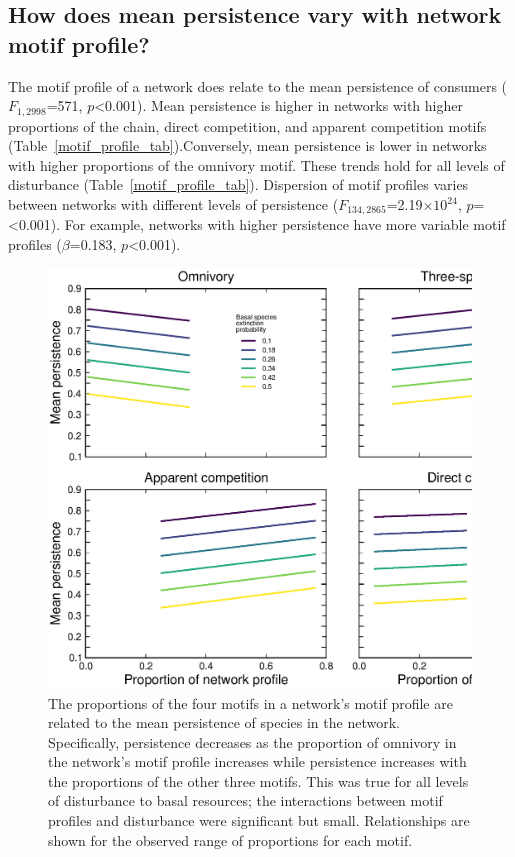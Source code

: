 \documentclass[12pt]{article}
\begin{document}
\begin{spacing}{2.0}
    \clearpage

    \subsection*{How does mean persistence vary with network motif profile?}
    
        The motif profile of a network does relate to the mean persistence of consumers ($F_{1,2998}$=571, $p$\textless0.001). Mean persistence is higher in networks with higher proportions of the chain, direct competition, and apparent competition motifs (Table~\ref{motif_profile_tab}).Conversely, mean persistence is lower in networks with higher proportions of the omnivory motif. These trends hold for all levels of disturbance (Table~\ref{motif_profile_tab}). Dispersion of motif profiles varies between networks with different levels of persistence ($F_{134,2865}$=2.19$\times10^{24}$, $p$=\textless0.001). For example, networks with higher persistence have more variable motif profiles ($\beta$=0.183, $p$\textless0.001).

    
    
    
        \begin{figure}
            \centering
            \includegraphics[height=.5\textheight]{figures/persistence_motif_profiles.eps}
            \caption{The proportions of the four motifs in a network's motif profile are related to the mean persistence of species in the network. Specifically, persistence decreases as the proportion of omnivory in the network's motif profile increases while persistence increases with the proportions of the other three motifs. This was true for all levels of disturbance to basal resources; the interactions between motif profiles and disturbance were significant but small. Relationships are shown for the observed range of proportions for each motif.}      
            \label{fig:motif_profile_persistence}
        \end{figure}    



\end{spacing}
\end{document}
